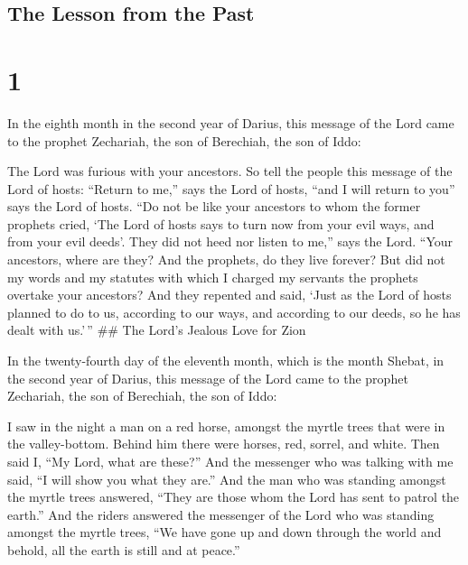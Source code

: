 \hypertarget{the-lesson-from-the-past}{%
\subsection{The Lesson from the Past}\label{the-lesson-from-the-past}}

\hypertarget{section}{%
\section{1}\label{section}}

 In the eighth month in the second year of Darius, this
message of the Lord came to the prophet Zechariah, the son of Berechiah,
the son of Iddo:

 The Lord was furious with your ancestors.  So
tell the people this message of the Lord of hosts: ``Return to me,''
says the Lord of hosts, ``and I will return to you'' says the Lord of
hosts.  ``Do not be like your ancestors to whom the former
prophets cried, `The Lord of hosts says to turn now from your evil ways,
and from your evil deeds'. They did not heed nor listen to me,'' says
the Lord.  ``Your ancestors, where are they? And the
prophets, do they live forever?  But did not my words and my
statutes with which I charged my servants the prophets overtake your
ancestors? And they repented and said, `Just as the Lord of hosts
planned to do to us, according to our ways, and according to our deeds,
so he has dealt with us.'\,'' \#\# The Lord's Jealous Love for Zion

 In the twenty-fourth day of the eleventh month, which is
the month Shebat, in the second year of Darius, this message of the Lord
came to the prophet Zechariah, the son of Berechiah, the son of Iddo:

 I saw in the night a man on a red horse, amongst the myrtle
trees that were in the valley-bottom. Behind him there were horses, red,
sorrel, and white.  Then said I, ``My Lord, what are
these?'' And the messenger who was talking with me said, ``I will show
you what they are.''  And the man who was standing amongst
the myrtle trees answered, ``They are those whom the Lord has sent to
patrol the earth.''  And the riders answered the messenger
of the Lord who was standing amongst the myrtle trees, ``We have gone up
and down through the world and behold, all the earth is still and at
peace.''

